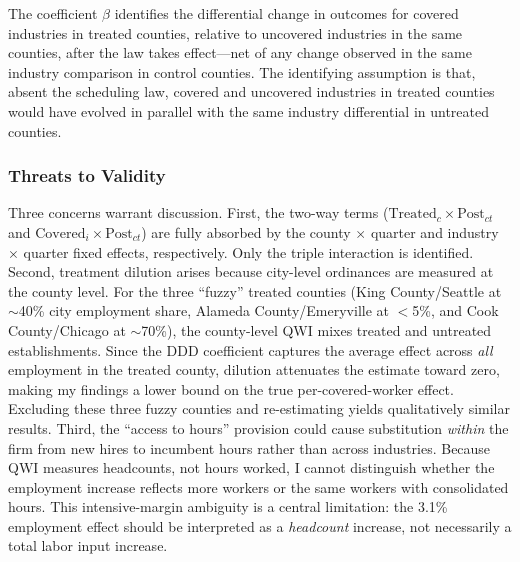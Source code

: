 \documentclass[12pt]{article}
\begin{document}
The coefficient $\beta$ identifies the differential change in outcomes for covered industries in treated counties, relative to uncovered industries in the same counties, after the law takes effect---net of any change observed in the same industry comparison in control counties. The identifying assumption is that, absent the scheduling law, covered and uncovered industries in treated counties would have evolved in parallel with the same industry differential in untreated counties.

\subsubsection*{Threats to Validity} Three concerns warrant discussion. First, the two-way terms ($\text{Treated}_c \times \text{Post}_{ct}$ and $\text{Covered}_i \times \text{Post}_{ct}$) are fully absorbed by the county $\times$ quarter and industry $\times$ quarter fixed effects, respectively. Only the triple interaction is identified. Second, treatment dilution arises because city-level ordinances are measured at the county level. For the three ``fuzzy'' treated counties (King County/Seattle at $\sim$40\% city employment share, Alameda County/Emeryville at $<$5\%, and Cook County/Chicago at $\sim$70\%), the county-level QWI mixes treated and untreated establishments. Since the DDD coefficient captures the average effect across \emph{all} employment in the treated county, dilution attenuates the estimate toward zero, making my findings a lower bound on the true per-covered-worker effect. Excluding these three fuzzy counties and re-estimating yields qualitatively similar results. Third, the ``access to hours'' provision could cause substitution \emph{within} the firm from new hires to incumbent hours rather than across industries. Because QWI measures headcounts, not hours worked, I cannot distinguish whether the employment increase reflects more workers or the same workers with consolidated hours. This intensive-margin ambiguity is a central limitation: the 3.1\% employment effect should be interpreted as a \emph{headcount} increase, not necessarily a total labor input increase.
\end{document}
